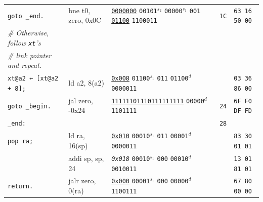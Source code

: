 \documentclass[a4paper,12pt,final]{article}
\begin{document}
\begin{table}[!htbp]
\begin{adjustwidth}{-1cm}{-1cm}
\begin{center}
\begin{tabular}{l|ll|l|l}
\hspace{2.106000em}   \texttt{goto \_end.} & bne t0, zero, 0x0C & \uline{\texttt{0000000}} \texttt{00101}​\(^{s_{2}}\) \texttt{00000}​\(^{s_{1}}\) \texttt{001} \uline{\texttt{01100}} \texttt{1100011} & \texttt{1C} & \texttt{63 16 50 00}\\[0pt]
\hspace{1.053000em} \emph{\# Otherwise, follow \texttt{xt}'s} &  &  &  & \\[0pt]
\hspace{1.053000em} \emph{\# link pointer and repeat.} &  &  &  & \\[0pt]
\hspace{1.053000em} \texttt{xt@a2 ← [xt@a2 + 8];} & ld a2, 8(a2) & \uline{\texttt{0x008}}                    \texttt{01100}​\(^{s_{1}}\) \texttt{011} \texttt{01100}​\(^{d}\)  \texttt{0000011} &  & \texttt{03 36 86 00}\\[0pt]
\hspace{1.053000em} \texttt{goto \_begin.} & jal zero, -0x24 & \uline{\texttt{11111101110111111111}}                                     \texttt{00000}​\(^{d}\)  \texttt{1101111} & \texttt{24} & \texttt{6F F0 DF FD}\\[0pt]
\texttt{\_end:} &  &  & \texttt{28} & \\[0pt]
\hspace{1.053000em} \texttt{pop ra;} & ld ra, 16(sp) & \uline{\texttt{0x010}}                    \texttt{00010}​\(^{s_{1}}\) \texttt{011} \texttt{00001}​\(^{d}\)  \texttt{0000011} &  & \texttt{83 30 01 01}\\[0pt]
\hspace{1.053000em} & addi sp, sp, 24 & \emph{\texttt{0x018}}                    \texttt{00010}​\(^{s_{1}}\) \texttt{000} \texttt{00010}​\(^{d}\)  \texttt{0010011} &  & \texttt{13 01 81 01}\\[0pt]
\hspace{1.053000em} \texttt{return.} & jalr zero, 0(ra) & \uline{\texttt{0x000}}                    \texttt{00001}​\(^{s_{1}}\) \texttt{000} \texttt{00000}​\(^{d}\)  \texttt{1100111} &  & \texttt{67 80 00 00}\\[0pt]
\end{tabular}

\end{center}
\normalsize \end{adjustwidth} \end{table} \vspace{0}
\end{document}
